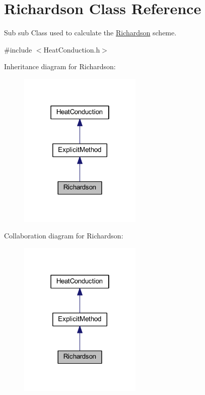 \hypertarget{class_richardson}{}\section{Richardson Class Reference}
\label{class_richardson}


Sub sub Class used to calculate the \hyperlink{class_richardson}{Richardson} scheme.  




{\ttfamily \#include $<$Heat\+Conduction.\+h$>$}



Inheritance diagram for Richardson\+:\nopagebreak
\begin{figure}[H]
\begin{center}
\leavevmode
\includegraphics[width=166pt]{class_richardson__inherit__graph}
\end{center}
\end{figure}


Collaboration diagram for Richardson\+:\nopagebreak
\begin{figure}[H]
\begin{center}
\leavevmode
\includegraphics[width=166pt]{class_richardson__coll__graph}
\end{center}
\end{figure}

